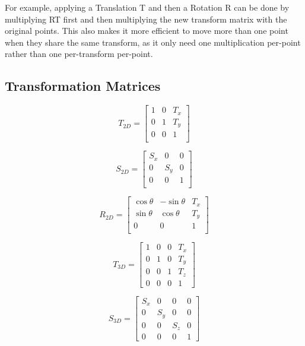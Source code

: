 For example, applying a Translation {T} and then a Rotation {R} can be done by multiplying {RT} first and then multiplying the new transform matrix with the original points. This also makes it more efficient to move more than one point when they share the same transform, as it only need one multiplication per-point rather than one per-transform per-point.
\subsection{Transformation Matrices}

\begin{equation}
\label{eqn:crossprodLine}
T_{2D} = \begin{bmatrix}
1 & 0 & T_x\\ 
0 & 1 & T_y\\ 
0 & 0 & 1\\ 
\end{bmatrix}
\end{equation}

\begin{equation}
\label{eqn:crossprodLine}
S_{2D} = \begin{bmatrix}
S_x & 0 & 0\\ 
0 & S_y & 0\\ 
0 & 0 & 1\\ 
\end{bmatrix}
\end{equation}

\begin{equation}
\label{eqn:crossprodLine}
R_{2D} = \begin{bmatrix}
\cos{\theta} & -\sin{\theta} & T_x\\ 
\sin{\theta} & \cos{\theta} & T_y\\ 
0 & 0 & 1\\ 
\end{bmatrix}
\end{equation}

\begin{equation}
\label{eqn:crossprodLine}
T_{3D} =\begin{bmatrix}
1 & 0 & 0 & T_x\\ 
0 & 1 & 0 & T_y\\ 
0 & 0 & 1 & T_z\\
0 & 0 & 0 & 1 
\end{bmatrix}
\end{equation}

\begin{equation}
\label{eqn:crossprodLine}
S_{3D} = \begin{bmatrix}
S_x & 0 & 0 & 0\\ 
0 & S_y & 0 & 0\\ 
0 & 0 & S_z & 0\\
0 & 0 & 0 & 1 
\end{bmatrix}
\end{equation}

